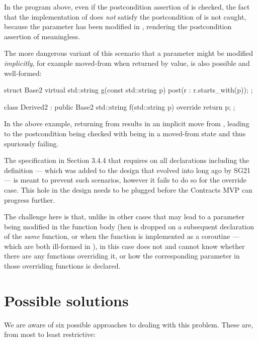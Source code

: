 In the program above, even if the postcondition assertion of  is checked, the fact that the implementation of  does \emph{not} satisfy the postcondition of  is not caught, because the parameter  has been modified in , rendering the postcondition assertion of  meaningless.

The more dangerous variant of this scenario that a parameter might be modified \emph{implicitly}, for example moved-from when returned by value, is also possible and well-formed:
\begin{codeblock}
struct Base2 {
  virtual std::string g(const std::string p) post(r : r.starts_with(p));
};

class Derived2 : public Base2 {
  std::string f(std::string p) override {
    return p;
  }
};
\end{codeblock}
In the above example, returning  from  results in an implicit move from , leading to the postcondition being checked with  being in a moved-from state and thus spuriously failing.

The specification in \cite{P2900R10} Section 3.4.4 that requires  on all declarations including the definition --- which was added to the design that evolved into \cite{P2900R10} long ago by SG21 --- is meant to prevent such scenarios, however it fails to do so for the override case. This hole in the design needs to be plugged before the Contracts MVP can progress further.

The challenge here is that, unlike in other cases that may lead to a  parameter being modified in the function body (hen  is dropped on a subsequent declaration of the \emph{same} function, or when the function is implemented as a coroutine --- which are both ill-formed in \cite{P2900R10}), in this case  does not and cannot know whether there are any functions overriding it, or how the corresponding parameter in those overriding functions is declared.

\section{Possible solutions}

We are aware of six possible approaches to dealing with this problem. These are, from most to least restrictive:


